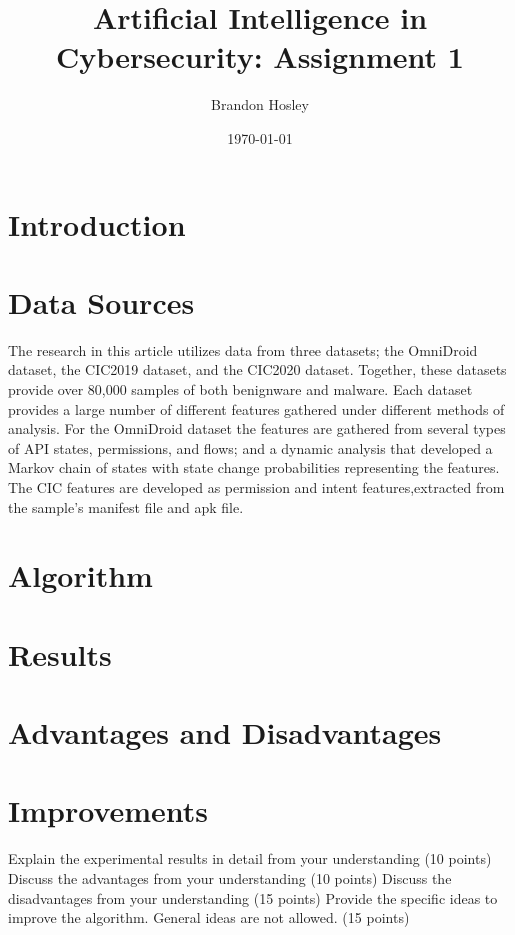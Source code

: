 \documentclass[]{article}
\title{Artificial Intelligence in Cybersecurity: Assignment 1}
\author{Brandon Hosley}
\date{\today}
\begin{document}
	\maketitle
	
\section{Introduction}

\section{Data Sources}

The research in this article utilizes data from three datasets; 
the OmniDroid \cite{Martin2019} dataset,  
the CIC2019 \cite{Taheri2019} dataset, and
the CIC2020 \cite{Rahali2020} dataset.
Together, these datasets provide over 80,000 samples of both benignware and malware.
Each dataset provides a large number of different features gathered under different methods of analysis.
For the OmniDroid dataset the features are gathered from several types of API states, permissions, and flows;
and a dynamic analysis that developed a Markov chain of states with state change probabilities representing the features.
The CIC features are developed as permission and intent features,extracted from the sample's manifest file and apk file.

\section{Algorithm}


\section{Results}
\section{Advantages and Disadvantages}
\section{Improvements}



Explain the experimental results in detail from your understanding (10 points)
Discuss the advantages from your understanding (10 points)
Discuss the disadvantages from your understanding (15 points)
Provide the specific ideas to improve the algorithm. General ideas are not allowed. (15 points)

\clearpage


\end{document}

